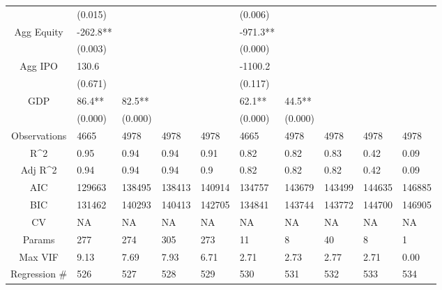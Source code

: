 \documentclass{article}
\begin{document}
\begin{table}[H]
\begin{tabular}{|clllllllll|}
   & (0.015) &  &  &  & (0.006) &  &  &  &  \\ 
  Agg Equity & -262.8** &  &  &  & -971.3** &  &  &  &  \\ 
   & (0.003) &  &  &  & (0.000) &  &  &  &  \\ 
  Agg IPO & 130.6 &  &  &  & -1100.2 &  &  &  &  \\ 
   & (0.671) &  &  &  & (0.117) &  &  &  &  \\ 
  GDP & 86.4** & 82.5** &  &  & 62.1** & 44.5** &  &  &  \\ 
   & (0.000) & (0.000) &  &  & (0.000) & (0.000) &  &  &  \\ 
  \hline 
 Observations & 4665 & 4978 & 4978 & 4978 & 4665 & 4978 & 4978 & 4978 & 4978 \\ 
  R^2 & 0.95 & 0.94 & 0.94 & 0.91 & 0.82 & 0.82 & 0.83 & 0.42 & 0.09 \\ 
  Adj R^2 & 0.94 & 0.94 & 0.94 & 0.9 & 0.82 & 0.82 & 0.82 & 0.42 & 0.09 \\ 
  AIC & 129663 & 138495 & 138413 & 140914 & 134757 & 143679 & 143499 & 144635 & 146885 \\ 
  BIC & 131462 & 140293 & 140413 & 142705 & 134841 & 143744 & 143772 & 144700 & 146905 \\ 
  CV & NA & NA & NA & NA & NA & NA & NA & NA & NA \\ 
  Params & 277 & 274 & 305 & 273 & 11 & 8 & 40 & 8 & 1 \\ 
  Max VIF & 9.13 & 7.69 & 7.93 & 6.71 & 2.71 & 2.73 & 2.77 & 2.71 & 0.00 \\ 
  Regression \# & 526 & 527 & 528 & 529 & 530 & 531 & 532 & 533 & 534 \\ 
   \hline
\end{tabular}
 
\end{table}
\end{document}
